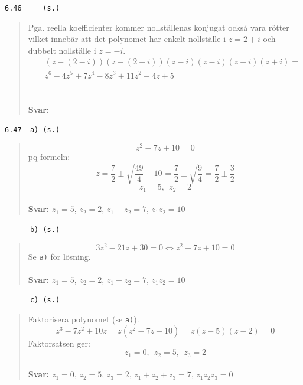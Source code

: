 \documentclass[a4paper]{article}
\newcommand{\tskcol}[1]{\textcolor{tskcol}{#1}}
\begin{document}
	\texttt{\tskcol{6.46~~~~ (s.)}}
	\begin{quotation}
		\noindent
		Pga. reella koefficienter kommer nollställenas konjugat också vara rötter vilket innebär att det polynomet har enkelt nollställe i $z=2+i$ och dubbelt nollställe i $z=-i$.
		\begin{align*}
		&(z-(2-i))(z-(2+i))(z-i)(z-i)(z+i)(z+i)= \\=
		&z^6-4z^5+7z^4-8z^3+11z^2-4z+5
		\end{align*}
		\\ \\
		\textbf{Svar:}
	\end{quotation}
	
	\texttt{\tskcol{6.47~~a) (s.)}}
	\begin{quotation}
		\noindent
		\[z^2-7z+10=0\]
		pq-formeln:
		\[z=\frac{7}{2}\pm\sqrt{\frac{49}{4}-10}=
		\frac{7}{2}\pm\sqrt{\frac{9}{4}}=
		\frac{7}{2}\pm\frac{3}{2}\]
		\[z_1=5,~~z_2=2\]
		\\
		\textbf{Svar:} $z_1=5$, $z_2=2$, $z_1+z_2=7$, $z_1z_2=10$
	\end{quotation}
	
	\texttt{\tskcol{~~~~~~b) (s.)}}
	\begin{quotation}
		\noindent
		\[3z^2-21z+30=0 \Leftrightarrow 
		z^2-7z+10=0\]
		Se \texttt{\tskcol{a)}} för lösning.
		\\ \\
		\textbf{Svar:} $z_1=5$, $z_2=2$, $z_1+z_2=7$, $z_1z_2=10$
	\end{quotation}
	
	\texttt{\tskcol{~~~~~~c) (s.)}}
	\begin{quotation}
		\noindent
		Faktorisera polynomet (se \texttt{\tskcol{a)}}).
		\[z^3-7z^2+10z=z(z^2-7z+10)=z(z-5)(z-2)=0\]
		Faktorsatsen ger:
		\[z_1=0,~~
		z_2=5,~~
		z_3=2\]
		\\
		\textbf{Svar:} $z_1=0$, $z_2=5$, $z_3=2$, $z_1+z_2+z_3=7$, $z_1z_2z_3=0$
	\end{quotation}
	
\end{document}

